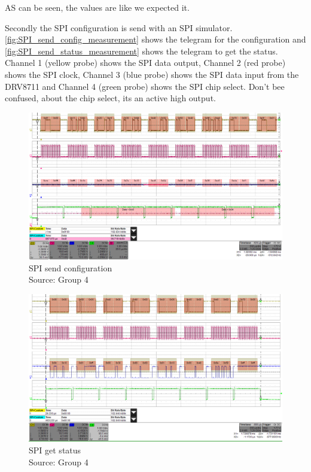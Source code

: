 \documentclass[a4paper,12pt]{scrreprt}
\begin{document}
AS can be seen, the values are like we expected it.

Secondly the \acs{SPI} configuration is send with an \acs{SPI} simulator. \autoref{fig:SPI_send_config_measurement} shows the telegram for the configuration and \autoref{fig:SPI_send_status_measurement} shows the telegram to get the status. Channel 1 (yellow probe) shows the \acs{SPI} data output, Channel 2 (red probe) shows the \acs{SPI} clock, Channel 3 (blue probe) shows the \acs{SPI} data input from the DRV8711 and Channel 4 (green probe) shows the \acs{SPI} chip select. Don't bee confused, about the chip select, its an active high output.

\begin{figure}[H]
  \centering
   \includegraphics[width=1\textwidth]{pictures/measurements/SPI_send_config_measurement}
   \caption[\acs{SPI} send configuration]{\acs{SPI} send configuration\\
	Source: Group 4  
  }
   \label{fig:SPI_send_config_measurement}
\end{figure}

\begin{figure}[H]
  \centering
   \includegraphics[width=1\textwidth]{pictures/measurements/SPI_send_status_measurement}
   \caption[\acs{SPI} get status]{\acs{SPI} get status\\
	Source: Group 4  
  }
   \label{fig:SPI_send_status_measurement}
\end{figure}
\end{document}
